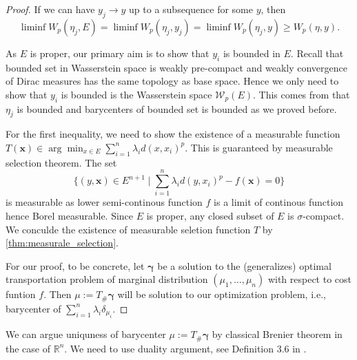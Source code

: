 \begin{proof}
		If we can have $y_j \rightarrow y$ up to a subsequence for some $y$, then 
		\[
			\liminf W_p(\eta_j, E) = \liminf W_p(\eta_j, y_j) = \liminf W_p(\eta_j, y) \geq W_p(\eta, y).
		\]

	As $E$ is proper, our primary aim is to show that $y_i$ is bounded in $E$. Recall that bounded set in Wasserstein space is weakly pre-compact and weakly convergence of Dirac measures has the same topology as base space. Hence we only need to show that $y_i$ is bounded is the Wasserstein space $\mathcal{W}_p(E)$. This comes from that $\eta_j$ is bounded and barycenters of bounded set is bounded as we proved before.

	For the first inequality, we need to show the existence of a measurable function $T(\boldsymbol{x}) \in \arg \min_{x \in E} \sum_{i=1}^{n} \lambda_i d(x, x_i)^p$. This is guaranteed by measurable selection theorem. The set 
	\[
		\{
			(y,\boldsymbol{x}) \in E^{n+1}\mid \sum_{i=1}^{n} \lambda_i d(y,x_i)^p - f(\boldsymbol{x}) = 0
	\}
	\]
	is measurable as lower semi-continous function $f$ is a limit of continous function hence Borel measurable. Since $E$ is proper, any closed subset of $E$ is $\sigma$-compact. We conculde the existence of measurable seletion function $T$ by \cref{thm:measurale_selection}.

For our proof, to be concrete, let $\boldsymbol \gamma$ be a solution to the (generalizes) optimal transportation problem of marginal distribution $(\mu_1, \ldots, \mu_n)$ with respect to cost funtion $f$. Then $\mu:= T_{\#}\boldsymbol \gamma$ will be solution to our optimization problem, i.e., barycenter of $\sum_{i=1}^{n}\lambda_i \delta_{\mu_i}$.

\end{proof}

\begin{rmk}
	We can argue uniquness of barycenter $\mu:= T_{\#}\boldsymbol \gamma$ by classical Brenier theorem in the case of $\mathbb{R}^n$. We need to use duality argument, see Definition 3.6 in \cite{agueh2011barycenters}.
\end{rmk}

